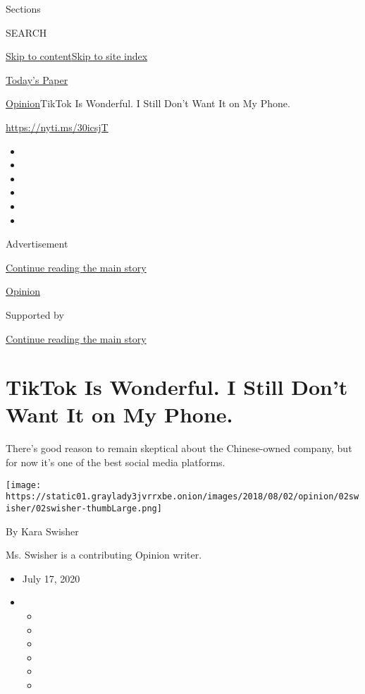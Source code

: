 Sections

SEARCH

\protect\hyperlink{site-content}{Skip to
content}\protect\hyperlink{site-index}{Skip to site index}

\href{https://myaccount.nytimes3xbfgragh.onion/auth/login?response_type=cookie\&client_id=vi}{}

\href{https://www.nytimes3xbfgragh.onion/section/todayspaper}{Today's
Paper}

\href{/section/opinion}{Opinion}\textbar{}TikTok Is Wonderful. I Still
Don't Want It on My Phone.

\url{https://nyti.ms/30icsjT}

\begin{itemize}
\item
\item
\item
\item
\item
\item
\end{itemize}

Advertisement

\protect\hyperlink{after-top}{Continue reading the main story}

\href{/section/opinion}{Opinion}

Supported by

\protect\hyperlink{after-sponsor}{Continue reading the main story}

\hypertarget{tiktok-is-wonderful-i-still-dont-want-it-on-my-phone}{%
\section{TikTok Is Wonderful. I Still Don't Want It on My
Phone.}\label{tiktok-is-wonderful-i-still-dont-want-it-on-my-phone}}

There's good reason to remain skeptical about the Chinese-owned company,
but for now it's one of the best social media platforms.

\texttt{[image: https://static01.graylady3jvrrxbe.onion/images/2018/08/02/opinion/02swisher/02swisher-thumbLarge.png]}

By Kara Swisher

Ms. Swisher is a contributing Opinion writer.

\begin{itemize}
\item
  July 17, 2020
\item
  \begin{itemize}
  \item
  \item
  \item
  \item
  \item
  \item
  \end{itemize}
\end{itemize}

